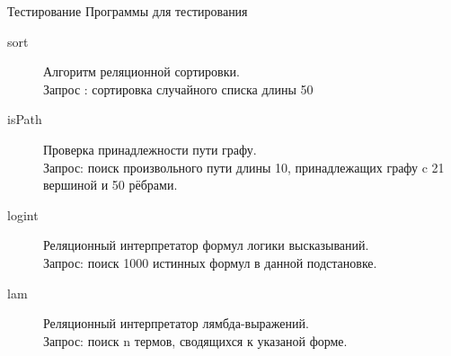 \documentclass[xcolor=table]{beamer}
\begin{document}
%
\begin{frame}{Тестирование}
{\small Программы для тестирования}
\begin{description}
\item[sort]Алгоритм реляционной сортировки.\\
      Запрос : сортировка случайного списка длины 50
\item[isPath] Проверка принадлежности пути графу.\\
      Запрос: поиск  произвольного пути длины 10, принадлежащих графу c 21 вершиной и 50 рёбрами.
\item[logint] Реляционный интерпретатор формул логики высказываний.\\
      Запрос: поиск 1000 истинных формул в данной подстановке.
\item[lam] Реляционный интерпретатор лямбда-выражений.\\
      Запрос: поиск n термов, сводящихся к указаной форме.
\end{description}
\end{frame}
\end{document}
